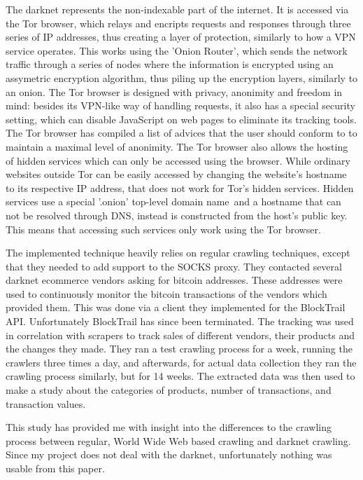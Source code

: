 \documentclass[12pt,a4paper,twoside]{report}
\begin{document}
The darknet represents the non-indexable part of the internet. It is accessed via the Tor browser, which relays and encripts requests and responses through three series of IP addresses, thus creating a layer of protection, similarly to how a VPN service operates. This works using the 'Onion Router', which sends the network traffic through a series of nodes where the information is encrypted using an assymetric encryption algorithm, thus piling up the encryption layers, similarly to an onion. The Tor browser is designed with privacy, anonimity and freedom in mind: besides its VPN-like way of handling requests, it also has a special security setting, which can disable JavaScript on web pages to eliminate its tracking tools. The Tor browser has compiled a list of advices that the user should conform to to maintain a maximal level of anonimity. The Tor browser also allows the hosting of hidden services which can only be accessed using the browser. While ordinary websites outside Tor can be easily accessed by changing the website's hostname to its respective IP address, that does not work for Tor's hidden services. Hidden services use a special '.onion' top-level domain name and a hostname that can not be resolved through DNS, instead is constructed from the host's public key. This means that accessing such services only work using the Tor browser.

The implemented technique heavily relies on regular crawling techniques, except that they needed to add support to the SOCKS proxy. They contacted several darknet ecommerce vendors asking for bitcoin addresses. These addresses were used to continuously monitor the bitcoin transactions of the vendors which provided them. This was done via a client they implemented for the BlockTrail API. Unfortunately BlockTrail has since been terminated. The tracking was used in correlation with scrapers to track sales of different vendors, their products and the changes they made. They ran a test crawling process for a week, running the crawlers three times a day, and afterwards, for actual data collection they ran the crawling process similarly, but for 14 weeks. The extracted data was then used to make a study about the categories of products, number of transactions, and transaction values.

This study has provided me with insight into the differences to the crawling process between regular, World Wide Web based crawling and darknet crawling. Since my project does not deal with the darknet, unfortunately nothing was usable from this paper.
\end{document}
